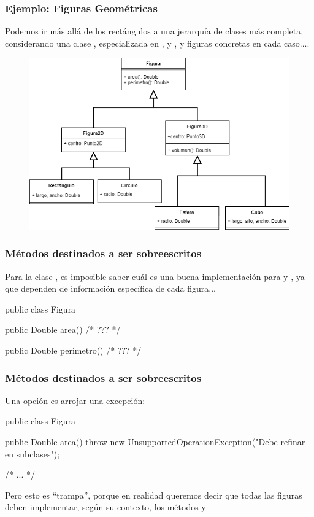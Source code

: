 \documentclass{beamer}
\begin{document}
\begin{frame}[fragile]
  \frametitle{Ejemplo: Figuras Geométricas}

  Podemos ir más allá de los rectángulos a una jerarquía de clases más
  completa, considerando una clase , especializada en
  , y , y figuras concretas en cada
  caso....

  \begin{center}
  \begin{figure}
    \includegraphics[scale=0.4]{figures/Figuras.png}
  \end{figure}
  \end{center}

\end{frame}

\begin{frame}[fragile]
  \frametitle{Métodos destinados a ser sobreescritos}

  Para la clase , es imposible saber cuál es una buena
  implementación para  y , ya que
  dependen de información específica de cada figura...

  \begin{jsmall}
    public class Figura {
      public Double area() {
        /* ??? */
      }

      public Double perimetro() {
        /* ??? */
      }
    }
  \end{jsmall}
\end{frame}

\begin{frame}[fragile]
  \frametitle{Métodos destinados a ser sobreescritos}

  Una opción es arrojar una excepción:

  \begin{jsmall}
    public class Figura {
      public Double area() {
       throw new UnsupportedOperationException("Debe refinar en subclases");
     }

     /* ... */
    }
  \end{jsmall}

  Pero esto es ``trampa'', porque en realidad queremos decir que todas
  las figuras deben implementar, según su contexto, los métodos
   y 
\end{frame}
\end{document}
